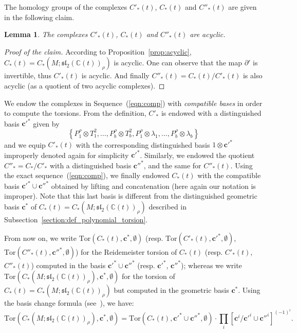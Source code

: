 \documentclass[a4paper]{amsart}
\theoremstyle{plain}
\newtheorem{lemma}[theorem]{Lemma}%
\theoremstyle{definition}
\theoremstyle{remark}
\newcommand{\CC}{{\mathbb C}}
\newcommand{\sllrhot}{\mathfrak{sl}_2(\CC(t))_\rho}
\newcommand{\Tor}[3]{\mathrm{Tor} ({#1}, {#2}, {#3})}
\newcommand{\cbasis}[2][c]{\mathbf{#1}^{#2}}
\begin{document}
The homology groups of the complexes $C'_*(t)$, $C_*(t)$ and
$C''_*(t)$ are given in the following claim.
\begin{lemma}\label{lemma:acyclicity_cpxes}
  The complexes $C'_*(t)$, $C_*(t)$ and $C''_*(t)$ are acyclic.
\end{lemma}
\begin{proof}[Proof of the claim]
  According to Proposition~\ref{prop:acyclic}, $C_*(t) = C_*(M;
  \sllrhot)$ is acyclic.  One can observe that the map $\partial'$ is
  invertible, thus $C'_*(t)$ is acyclic.  And finally $C''_*(t) =
  C_*(t) / C'_*(t)$ is also acyclic (as a quotient of two acyclic
  complexes).
\end{proof}

We endow the complexes in Sequence~(\ref{eqn:comp}) with
\emph{compatible bases} in order to compute the torsions.  From the
definition, $C'_*$ is endowed with a distinguished basis
$\cbasis[c']{*}$ given by
\[
\left\{ 
  P^\rho_1 \otimes T^2_1, 
    \ldots, 
  P^\rho_b \otimes T^2_b, 
  P^\rho_1 \otimes \lambda_1, 
    \ldots,
  P^\rho_b \otimes \lambda_b
\right\}
\]
and we equip $C'_*(t)$ with the corresponding distinguished basis $1
\otimes \cbasis[c']{*}$ improperly denoted again for simplicity
$\cbasis[c']{*}$.  Similarly, we endowed the quotient $C''_* = C_* /
C'_*$ with a distinguished basis $\cbasis[c'']{*}$, and the same for
$C''_*(t)$.  Using the exact sequence~(\ref{eqn:comp}), we finally
endowed $C_*(t)$ with the compatible basis $\cbasis[c']{*} \cup
\cbasis[c'']{*}$ obtained by lifting and concatenation (here again our
notation is improper).  Note that this last basis is different from
the distinguished geometric basis $\cbasis{*}$ of $C_*(t) =
C_*(M; \sllrhot)$ described in
Subsection~\ref{section:def_polynomial_torsion}.

From now on, we write $\Tor{C_*(t)}{\cbasis{*}}{\emptyset}$
(resp. $\Tor{C'_*(t)}{\cbasis[c']{*}}{\emptyset}$,
$\Tor{C''_*(t)}{\cbasis[c'']{*}}{\emptyset}$) for the Reidemeister
torsion of $C_*(t)$ (resp. $C'_*(t)$, $C''_*(t)$) computed in the
basis $\cbasis[c']{*} \cup \cbasis[c'']{*}$ (resp. $\cbasis[c']{*}$,
$\cbasis[c'']{*}$); whereas we write $\Tor{C_*(M;
  \sllrhot)}{\cbasis{*}}{\emptyset}$ for the torsion of $C_*(t) =
C_*(M; \sllrhot)$ but computed in the geometric basis $\cbasis{*}$.
Using the basis change formula (see~\cite[Proposition
0.2]{Porti:1997}), we have:
\[
\Tor{C_*(M; \sllrhot)}{\cbasis{*}}{\emptyset} =
\Tor{C_*(t)}{\cbasis[c']{*} \cup \cbasis[c'']{*}}{\emptyset} \cdot
\prod_i [ \cbasis{i}/\cbasis[c']{i} \cup \cbasis[c'']{i} ]^{(-1)^{i}}.
\]
\end{document}
